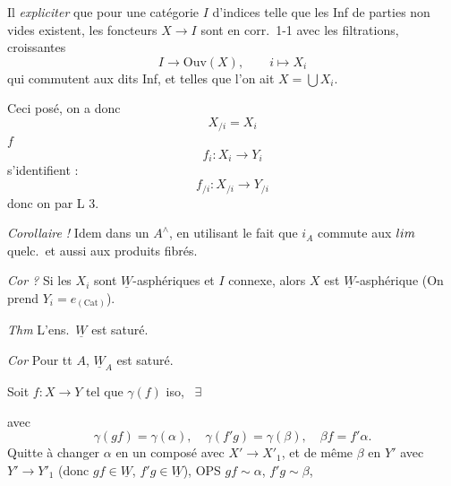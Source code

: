 \documentclass[11pt,a4paper]{article}
\begin{document}

Il  \emph{expliciter} que pour une catégorie $I$
d'indices telle que les Inf de parties non vides existent, les foncteurs
$X \to I$ sont en corr.\ 1-1 avec les filtrations, \struck{\ill{}}
 croissantes
\[
  I \to \mathrm{Ouv}(X), \qquad i \mapsto X_i
\]
qui commutent aux dits Inf, et telles que l'on ait $X = \bigcup X_i$.

Ceci posé, on a donc
\[
  X_{/i} = X_i
\]
 \struck{\ill{}}  $f$
\[
  f_i : X_i \to Y_i
\]
s'identifient :
\[
  f_{/i} : X_{/i} \to Y_{/i}
\]
donc on \ill{} par L 3.

\emph{Corollaire !} Idem dans un $A^{\wedge}$, en utilisant le fait que
$i_A$ commute aux $\varinjlim$ quelc.\ et aussi aux produits fibrés.

\emph{Cor ?} Si les $X_i$ sont $\underline{W}$-asphériques et $I$
connexe, alors $X$ est $\underline{W}$-asphérique (On prend $Y_i =
e_{(\mathrm{Cat})}$).

\emph{Thm} L'ens.\ $\underline{W}$ est saturé.

\emph{Cor} Pour tt $A$, $\underline{W}_A$ est saturé.

 Soit $f : X \to Y$ tel que $\gamma(f)$ iso,
\ $\exists$


avec
\[
  \gamma(gf) = \gamma(\alpha), \quad \gamma(f'g) = \gamma(\beta), \quad
  \beta f = f' \alpha .
\]
Quitte à changer $\alpha$ en un composé avec $X' \to X'_1$, et de même
$\beta$ en $Y'$ avec $Y' \to Y'_1$ (donc $gf \in \underline{W}$, $f'g \in
\underline{W}$), OPS $gf \sim \alpha$, $f'g \sim \beta$,
  \struck{\ill{}}
\end{document}
